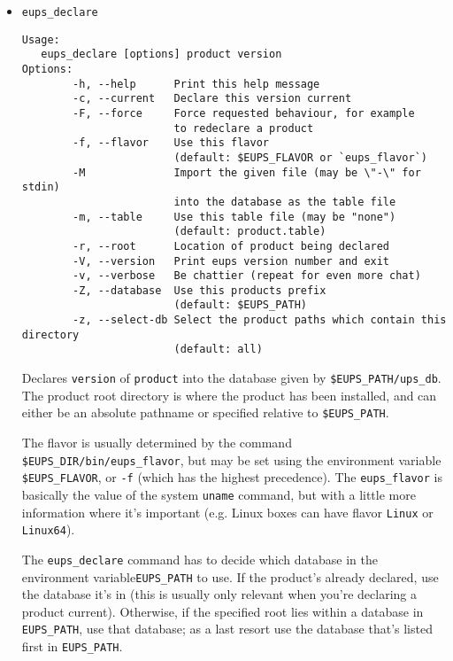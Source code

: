 \documentclass{article}
\newcommand{\code}[1]{\texttt{#1}}
\begin{document}
\begin{itemize}


\item \code{eups\_declare}
\begin{verbatim}
Usage:
   eups_declare [options] product version
Options:
        -h, --help      Print this help message
        -c, --current   Declare this version current
        -F, --force     Force requested behaviour, for example
                        to redeclare a product
        -f, --flavor    Use this flavor
                        (default: $EUPS_FLAVOR or `eups_flavor`)
        -M              Import the given file (may be \"-\" for stdin)
                        into the database as the table file
        -m, --table     Use this table file (may be "none")
                        (default: product.table)
        -r, --root      Location of product being declared
        -V, --version   Print eups version number and exit
        -v, --verbose   Be chattier (repeat for even more chat)
        -Z, --database  Use this products prefix
                        (default: $EUPS_PATH)
        -z, --select-db Select the product paths which contain this directory 
                        (default: all)
\end{verbatim}

Declares \code{version} of \code{product} into the database given by \code{\$EUPS\_PATH/ups\_db}.
The product root directory is where the product has been installed, and can either
be an absolute pathname or specified relative to \code{\$EUPS\_PATH}.

The flavor is usually determined by the command \code{\$EUPS\_DIR/bin/eups\_flavor},
but may be set using the
environment variable \code{\$EUPS\_FLAVOR}, or \code{-f} (which has the highest
precedence).  The \code{eups\_flavor} is basically the value of the system \code{uname}
command, but with a little more information where it's important (e.g. Linux boxes
can have flavor \code{Linux} or \code{Linux64}).

The \code{eups\_declare} command has to decide which database in the environment
variable\code{EUPS\_PATH}
to use.  If the product's already declared, use the database it's in (this is usually
only relevant when you're declaring a product current).  Otherwise, if the specified root
lies within a database in \code{EUPS\_PATH}, use that database; as a last resort use
the database that's listed first in \code{EUPS\_PATH}.


\end{itemize}
\end{document}
